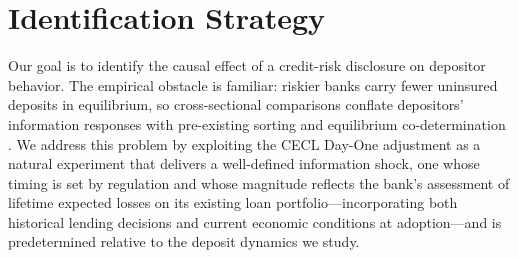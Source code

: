 
\section{Identification Strategy}
\label{sec:identification}

Our goal is to identify the causal effect of a credit-risk disclosure on
depositor behavior.  The empirical obstacle is familiar: riskier banks
carry fewer uninsured deposits in equilibrium, so cross-sectional comparisons
conflate depositors' information responses with pre-existing sorting and
equilibrium co-determination \citep{covitz2004market, chen2022bank}.
We address this problem by exploiting the CECL Day-One adjustment as a
natural experiment that delivers a well-defined information shock, one whose
timing is set by regulation and whose magnitude reflects the bank's assessment
of lifetime expected losses on its existing loan portfolio---incorporating both
historical lending decisions and current economic conditions at adoption---and
is predetermined relative to the deposit dynamics we study.


